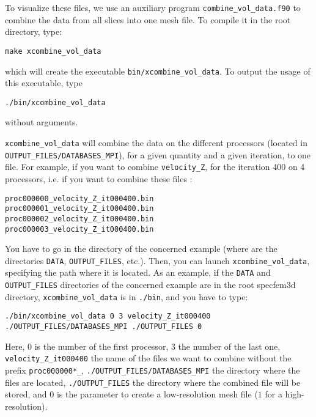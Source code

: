 To visualize these files, we use an auxiliary program \texttt{combine\_vol\_data.f90}
to combine the data from all slices into one mesh file. To compile
it in the root directory, type:

{\footnotesize
\begin{verbatim}
make xcombine_vol_data
\end{verbatim}
}
\noindent
which will create the executable \texttt{bin/xcombine\_vol\_data}.
To output the usage of this executable, type

{\footnotesize
\begin{verbatim}
./bin/xcombine_vol_data
\end{verbatim}
}
\noindent
without arguments.

\medskip

\texttt{xcombine\_vol\_data} will combine the data on the different processors (located in \texttt{OUTPUT\_FILES/DATABASES\_MPI}), for a given quantity and a given iteration, to one file. For example, if you want to combine \texttt{velocity\_Z}, for the iteration 400 on 4 processors, i.e. if you want to combine these files :
{\small
\begin{verbatim}
proc000000_velocity_Z_it000400.bin
proc000001_velocity_Z_it000400.bin
proc000002_velocity_Z_it000400.bin
proc000003_velocity_Z_it000400.bin
\end{verbatim}
}

You have to go in the directory of the concerned example (where are the directories \texttt{DATA}, \texttt{OUTPUT\_FILES}, etc.).
Then, you can launch \texttt{xcombine\_vol\_data}, specifying the path where it is located. As an example, if the \texttt{DATA} and \texttt{OUTPUT\_FILES} directories of the concerned example are in the root specfem3d directory, \texttt{xcombine\_vol\_data} is in \texttt{./bin}, and you have to type:

{\footnotesize
\begin{verbatim}
./bin/xcombine_vol_data 0 3 velocity_Z_it000400 ./OUTPUT_FILES/DATABASES_MPI ./OUTPUT_FILES 0
\end{verbatim}
}
Here, $0$ is the number of the first processor, $3$ the number of the last one, \texttt{velocity\_Z\_it000400} the name of the files we want to combine without the prefix \texttt{proc000000*\_}, \texttt{./OUTPUT\_FILES/DATABASES\_MPI} the directory where the files are located, \texttt{./OUTPUT\_FILES} the directory where the combined file will be stored, and $0$ is the parameter to create a low-resolution mesh file ($1$ for a high-resolution).\newline

